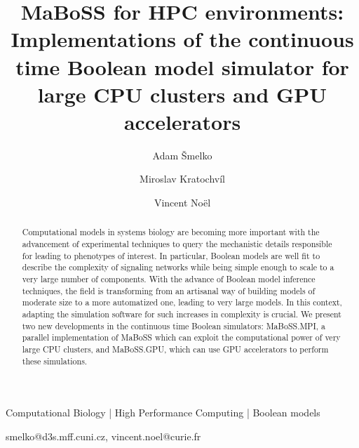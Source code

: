 \documentclass[times, twoside]{zHenriquesLab-StyleBioRxiv}
\begin{document}
\title{MaBoSS for HPC environments: Implementations of the continuous time Boolean model simulator for large CPU clusters and GPU accelerators}

\author[1,\Letter]{Adam Šmelko}
\author[2]{Miroslav Kratochvíl}
\author[3,4,5,\Letter]{Vincent Noël}

\maketitle

\begin{abstract}
Computational models in systems biology are becoming more important with the advancement of experimental techniques to query the mechanistic details responsible for leading to phenotypes of interest. In particular, Boolean models are well fit to describe the complexity of signaling networks while being simple enough to scale to a very large number of components. With the advance of Boolean model inference techniques, the field is transforming from an artisanal way of building models of moderate size to a more automatized one, leading to very large models. In this context, adapting the simulation software for such increases in complexity is crucial. 
We present two new developments in the continuous time Boolean simulators: MaBoSS.MPI, a parallel implementation of MaBoSS which can exploit the computational power of very large CPU clusters, and MaBoSS.GPU, which can use GPU accelerators to perform these simulations. 
\end {abstract}

\begin{keywords}
Computational Biology | High Performance Computing | Boolean models
\end{keywords}

\begin{corrauthor}
smelko@d3s.mff.cuni.cz, vincent.noel@curie.fr
\end{corrauthor}
\end{document}
